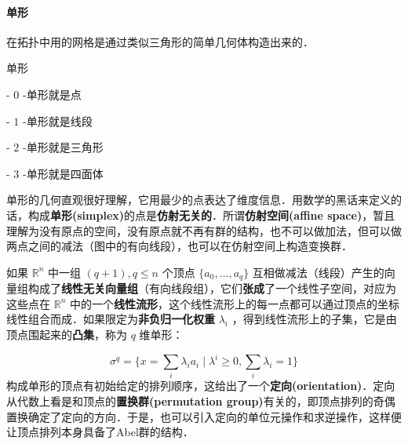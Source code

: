         \paragraph{单形}
            在拓扑中用的网格是通过类似三角形的简单几何体构造出来的．\par
            单形\par
            - $0$ -单形就是点\par
            - $1$ -单形就是线段\par
            - $2$ -单形就是三角形\par
            - $3$ -单形就是四面体\par
            单形的几何直观很好理解，它用最少的点表达了维度信息．用数学的黑话来定义的话，构成\textbf{单形(simplex)}的点是\textbf{仿射无关的}．所谓\textbf{仿射空间(affine space)}，暂且理解为没有原点的空间，没有原点就不再有群的结构，也不可以做加法，但可以做两点之间的减法（图中的有向线段），也可以在仿射空间上构造变换群．\par
            如果 $\mathbb{R}^n$ 中一组 $(q+1),q\leq n$ 个顶点 $\{a_0, \dots, a_q\}$ 互相做减法（线段）产生的向量组构成了\textbf{线性无关向量组}（有向线段组），它们\textbf{张成}了一个线性子空间，对应为这些点在 $\mathbb{R}^n$ 中的一个\textbf{线性流形}，这个线性流形上的每一点都可以通过顶点的坐标线性组合而成．如果限定为\textbf{非负归一化权重} $\lambda_i$ ，得到线性流形上的子集，它是由顶点围起来的\textbf{凸集}，称为 $q$ 维单形：\par
            $$
                \sigma^q = \{ x = \sum_i \lambda_ia_i \mid \lambda^i\geq 0, \sum_i \lambda_i = 1 \} \label{eq:homology-simplex}
            $$
            构成单形的顶点有初始给定的排列顺序，这给出了一个\textbf{定向(orientation)}．定向从代数上看是和顶点的\textbf{置换群(permutation group)}有关的，即顶点排列的奇偶置换确定了定向的方向．于是，也可以引入定向的单位元操作和求逆操作，这样便让顶点排列本身具备了Abel群的结构．\par

